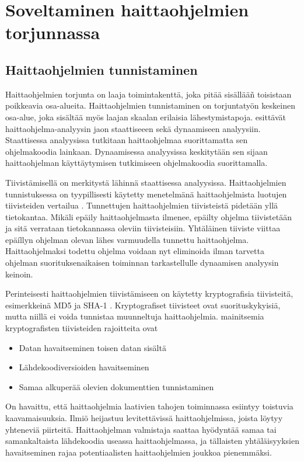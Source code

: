 \chapter{Soveltaminen haittaohjelmien torjunnassa\label{fuzzy-application}}


\section{Haittaohjelmien tunnistaminen}
Haittaohjelmien torjunta on laaja toimintakenttä, joka pitää
sisällääñ toisistaan poikkeavia osa-alueita. Haittaohjelmien
tunnistaminen on torjuntatyön keskeinen osa-alue, joka
sisältää myös laajan skaalan erilaisia lähestymistapoja.
\textcite{aslan20} esittävät haittaohjelma-analyysin
jaon staattiseeen sekä dynaamiseen analyysiin. Staattisessa analyysissa
tutkitaan haittaohjelmaa suorittamatta sen ohjelmakoodia lainkaan.
Dynaamisessa analyysissa keskitytään sen sijaan haittaohjelman 
käyttäytymisen tutkimiseen ohjelmakoodia suorittamalla.

Tiivistämisellä on merkitystä lähinnä staattisessa analyysissa.
Haittaohjelmien tunnistuksessa on tyypillisesti käytetty menetelmänä
haittaohjelmista luotujen tiivisteiden vertailua \parencite{sarantinos16}.
Tunnettujen haittaohjelmien tiivisteistä pidetään yllä tietokantaa.
Mikäli epäily haittaohjelmasta ilmenee, epäilty ohjelma tiivistetään
ja sitä verrataan tietokannassa oleviin tiivisteisiin. Yhtäläinen tiiviste
viittaa epäíllyn ohjelman olevan lähes varmuudella tunnettu haittaohjelma.
Haittaohjelmaksi todettu ohjelma voidaan nyt eliminoida ilman tarvetta
ohjelman suorituksenaikaisen toiminnan tarkastellulle dynaamisen
analyysin keinoin.

Perinteisesti haittaohjelmien tiivistämiseen on käytetty kryptografisia
tiivisteitä, esimerkkeinä MD5 ja SHA-1 \parencite{sarantinos16}. Kryptografiset
tiivisteet ovat suorituskykyisiä, mutta niillä ei voida tunnistaa muunneltuja
haittaohjelmia. \textcite{roussev11} mainitsemia kryptografisten tiivisteiden
rajoitteita ovat

\begin{itemize}
   \item Datan havaitseminen toisen datan sisältä
   \item Lähdekoodiversioiden havaitseminen
   \item Samaa alkuperää olevien dokumenttien tunnistaminen
\end{itemize}

On havaittu, että haittaohjelmia laativien tahojen toiminnassa
esiintyy toistuvia kaavamaisuuksia. Ilmiö heijastuu levitettävissä
haittaohjelmissa, joista löytyy yhteneviä piirteitä. Haittaohjelman
valmistaja saattaa hyödyntää samaa tai samankaltaista lähdekoodia
useassa haittaohjelmassa, ja tällaisten yhtäläisyyksien havaitseminen
rajaa potentiaalisten haittaohjelmien joukkoa pienemmäksi.


